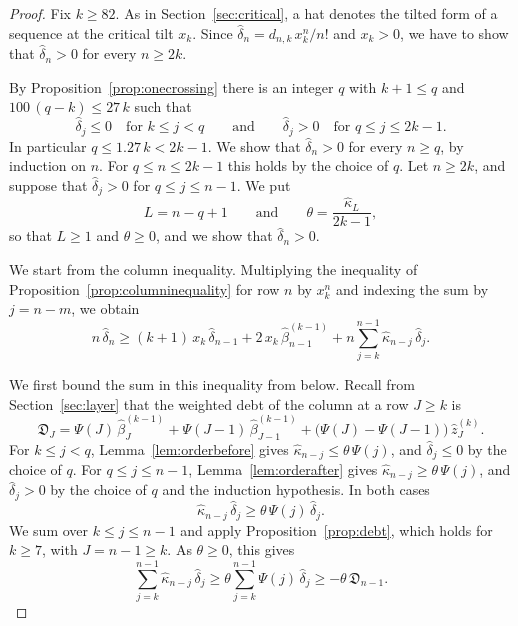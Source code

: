\documentclass{amsart}
\theoremstyle{definition}
\theoremstyle{remark}
\numberwithin{equation}{section}
\begin{document}
\begin{proof}
Fix $k\ge 82$. As in Section~\ref{sec:critical}, a hat denotes the tilted form of a sequence at the critical tilt $x_k$. Since $\hat\delta_n=d_{n,k}\,x_k^{n}/n!$ and $x_k>0$, we have to show that $\hat\delta_n>0$ for every $n\ge 2k$.

By Proposition~\ref{prop:onecrossing} there is an integer $q$ with $k+1\le q$ and $100\,(q-k)\le 27\,k$ such that
\[
\hat\delta_j\le 0\quad\text{for } k\le j<q\qquad\text{and}\qquad \hat\delta_j>0\quad\text{for } q\le j\le 2k-1 .
\]
In particular $q\le 1.27\,k<2k-1$. We show that $\hat\delta_n>0$ for every $n\ge q$, by induction on $n$. For $q\le n\le 2k-1$ this holds by the choice of $q$. Let $n\ge 2k$, and suppose that $\hat\delta_j>0$ for $q\le j\le n-1$. We put
\[
L=n-q+1\qquad\text{and}\qquad\theta=\frac{\hat\kappa_L}{2k-1},
\]
so that $L\ge 1$ and $\theta\ge 0$, and we show that $\hat\delta_n>0$.

We start from the column inequality. Multiplying the inequality of Proposition~\ref{prop:columninequality} for row $n$ by $x_k^{n}$ and indexing the sum by $j=n-m$, we obtain
\begin{equation}\label{eq:left-column}
n\,\hat\delta_n\ge(k+1)\,x_k\,\hat\delta_{n-1}+2\,x_k\,\hat\beta^{(k-1)}_{n-1}+n\sum_{j=k}^{n-1}\hat\kappa_{n-j}\,\hat\delta_j .
\end{equation}

We first bound the sum in this inequality from below. Recall from Section~\ref{sec:layer} that the weighted debt of the column at a row $J\ge k$ is
\[
\mathfrak D_J=\Psi(J)\,\hat\beta^{(k-1)}_J+\Psi(J-1)\,\hat\beta^{(k-1)}_{J-1}+\bigl(\Psi(J)-\Psi(J-1)\bigr)\,\hat z^{(k)}_J .
\]
For $k\le j<q$, Lemma~\ref{lem:orderbefore} gives $\hat\kappa_{n-j}\le\theta\,\Psi(j)$, and $\hat\delta_j\le 0$ by the choice of $q$. For $q\le j\le n-1$, Lemma~\ref{lem:orderafter} gives $\hat\kappa_{n-j}\ge\theta\,\Psi(j)$, and $\hat\delta_j>0$ by the choice of $q$ and the induction hypothesis. In both cases
\[
\hat\kappa_{n-j}\,\hat\delta_j\ge\theta\,\Psi(j)\,\hat\delta_j .
\]
We sum over $k\le j\le n-1$ and apply Proposition~\ref{prop:debt}, which holds for $k\ge 7$, with $J=n-1\ge k$. As $\theta\ge 0$, this gives
\[
\sum_{j=k}^{n-1}\hat\kappa_{n-j}\,\hat\delta_j\ge\theta\sum_{j=k}^{n-1}\Psi(j)\,\hat\delta_j\ge-\theta\,\mathfrak D_{n-1}.
\]


\end{proof}
\end{document}
